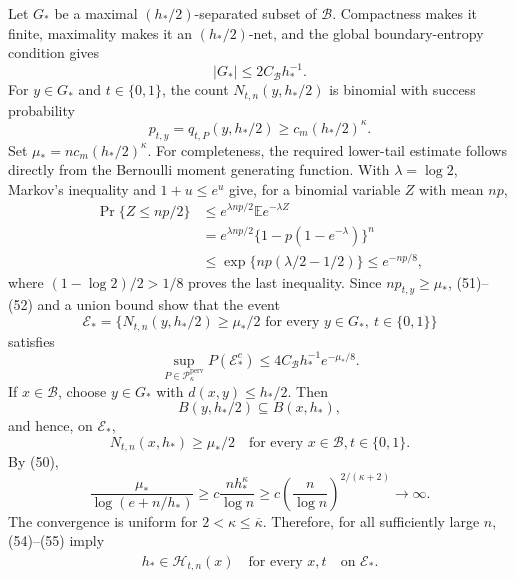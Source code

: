 Let \(G_*\) be a maximal \((h_*/2)\)-separated subset of \(\mathcal B\).  Compactness makes it finite, maximality makes it an \((h_*/2)\)-net, and the global boundary-entropy condition gives
\[
 |G_*|\le 2C_{\mathcal B}h_*^{-1}. \tag{51}
\]
For \(y\in G_*\) and \(t\in\{0,1\}\), the count \(N_{t,n}(y,h_*/2)\) is binomial with success probability
\[
 p_{t,y}=q_{t,P}(y,h_*/2)
 \ge c_m(h_*/2)^{\kappa}.
\]
Set \(\mu_*=nc_m(h_*/2)^{\kappa}\).  For completeness, the required lower-tail estimate follows directly from the Bernoulli moment generating function.  With \(\lambda=\log2\), Markov's inequality and \(1+u\le e^u\) give, for a binomial variable \(Z\) with mean \(np\),
\[
 \begin{aligned}
 \Pr\{Z\le np/2\}
 &\le e^{\lambda np/2}\mathbb E e^{-\lambda Z}\\
 &=e^{\lambda np/2}\{1-p(1-e^{-\lambda})\}^{n}\\
 &\le\exp\{np(\lambda/2-1/2)\}
 \le e^{-np/8},
 \end{aligned} \tag{52}
\]
where \((1-\log2)/2>1/8\) proves the last inequality.  Since \(np_{t,y}\ge\mu_*\), (51)--(52) and a union bound show that the event
\[
 \mathcal E_*=
 \{N_{t,n}(y,h_*/2)\ge\mu_*/2
   \text{ for every }y\in G_*,\ t\in\{0,1\}\}
\]
satisfies
\[
 \sup_{P\in\mathcal P_{\kappa}^{\mathrm{perv}}}
 P(\mathcal E_*^c)
 \le 4C_{\mathcal B}h_*^{-1}e^{-\mu_*/8}. \tag{53}
\]
If \(x\in\mathcal B\), choose \(y\in G_*\) with \(d(x,y)\le h_*/2\).  Then
\[
 B(y,h_*/2)\subseteq B(x,h_*),
\]
and hence, on \(\mathcal E_*\),
\[
 N_{t,n}(x,h_*)\ge\mu_*/2
 \quad\text{for every }x\in\mathcal B, t\in\{0,1\}. \tag{54}
\]
By (50),
\[
 \frac{\mu_*}{\log(e+n/h_*)}
 \ge c\frac{nh_*^{\kappa}}{\log n}
 \ge c\left(\frac{n}{\log n}\right)^{2/(\kappa+2)}\longrightarrow\infty. \tag{55}
\]
The convergence is uniform for \(2<\kappa\le\overline\kappa\).  Therefore, for all sufficiently large \(n\), (54)--(55) imply
\[
 h_*\in\widehat{\mathcal H}_{t,n}(x)
 \quad\text{for every }x,t \quad\text{on }\mathcal E_*. \tag{56}
\]

